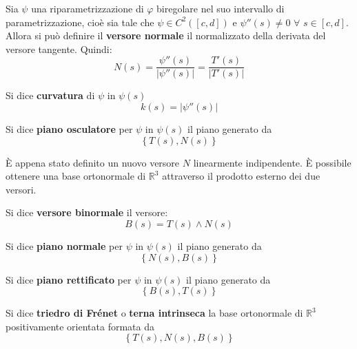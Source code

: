 \begin{definition}
    Sia $\psi$ una riparametrizzazione di $\varphi$ biregolare nel suo intervallo di parametrizzazione, cioè sia tale che $\psi \in C^2([c,d])$ e $\psi''(s) \neq 0$ $\forall$ $s \in [c,d]$. Allora si può definire il \textbf{versore normale} il normalizzato della derivata del versore tangente. Quindi:
    \begin{equation*}
        N(s)=\frac{\psi''(s)}{|\psi''(s)|}=\frac{T'(s)}{|T'(s)|}
    \end{equation*}
\end{definition}
\begin{definition}
    Si dice \textbf{curvatura} di $\psi$ in $\psi(s)$ 
    \begin{equation*}
        k(s)= |\psi''(s)|
    \end{equation*}
\end{definition}
\begin{definition}
    Si dice \textbf{piano osculatore} per $\psi$ in $\psi(s)$ il piano generato da 
    \begin{equation*}
        \left\{T(s), N(s)\right\}
    \end{equation*} 
\end{definition}
È appena stato definito un nuovo versore $N$ linearmente indipendente. È possibile ottenere una base ortonormale di $\mathbb{R}^3$ attraverso il prodotto esterno dei due versori.
\begin{definition}
    Si dice \textbf{versore binormale} il versore:
    \begin{equation*}
        B(s)=T(s) \wedge N(s)
    \end{equation*}
\end{definition}
\begin{definition}
    Si dice \textbf{piano normale} per $\psi$ in $\psi(s)$ il piano generato da
    \begin{equation*}
        \left\{N(s), B(s)\right\}
    \end{equation*}
\end{definition}
\begin{definition}
    Si dice \textbf{piano rettificato} per $\psi$ in $\psi(s)$ il piano generato da
    \begin{equation*}
        \left\{ B(s), T(s) \right\}
    \end{equation*}
\end{definition}
\begin{definition}
    Si dice \textbf{triedro di Frénet} o \textbf{terna intrinseca} la base ortonormale di $\mathbb{R}^3$ positivamente orientata formata da
    \begin{equation*}
        \left\{T(s), N(s), B(s)\right\}
    \end{equation*}
\end{definition}
